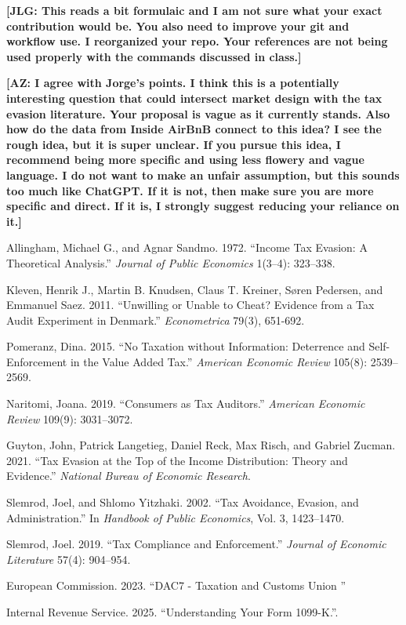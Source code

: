 \documentclass[11pt]{article}
\begin{document}
\bigskip 

\noindent \textbf{[JLG: This reads a bit formulaic and I am not sure what your exact contribution would be. You also need to improve your git and workflow use. I reorganized your repo. Your references are not being used properly with the commands discussed in class.]}

\vspace{5em}

\noindent \textbf{[AZ: I agree with Jorge's points. I think this is a potentially interesting question that could intersect market design with the tax evasion literature. Your proposal is vague as it currently stands. Also how do the data from Inside AirBnB connect to this idea? I see the rough idea, but it is super unclear. If you pursue this idea, I recommend being more specific and using less flowery and vague language. I do not want to make an unfair assumption, but this sounds too much like ChatGPT. If it is not, then make sure you are more specific and direct. If it is, I strongly suggest reducing your reliance on it.]}

\newpage
\begin{thebibliography}{9}\small
{}
Allingham, Michael G., and Agnar Sandmo. 1972. ``Income Tax Evasion: A Theoretical Analysis.'' \textit{Journal of Public Economics} 1(3--4): 323--338.

Kleven, Henrik J., Martin B. Knudsen, Claus T. Kreiner, S\o ren Pedersen, and Emmanuel Saez. 2011. ``Unwilling or Unable to Cheat? Evidence from a Tax Audit Experiment in Denmark.'' \textit{Econometrica} 79(3), 651-692.

Pomeranz, Dina. 2015. ``No Taxation without Information: Deterrence and Self-Enforcement in the Value Added Tax.'' \textit{American Economic Review} 105(8): 2539--2569.

Naritomi, Joana. 2019. ``Consumers as Tax Auditors.'' \textit{American Economic Review} 109(9): 3031--3072.

Guyton, John, Patrick Langetieg, Daniel Reck, Max Risch, and Gabriel Zucman. 2021. ``Tax Evasion at the Top of the Income Distribution: Theory and Evidence.'' \textit{National Bureau of Economic Research}.

Slemrod, Joel, and Shlomo Yitzhaki. 2002. ``Tax Avoidance, Evasion, and Administration.'' In \textit{Handbook of Public Economics}, Vol. 3, 1423--1470.

Slemrod, Joel. 2019. ``Tax Compliance and Enforcement.'' \textit{Journal of Economic Literature} 57(4): 904--954.

European Commission. 2023. ``DAC7 - Taxation and Customs Union
'' 

Internal Revenue Service. 2025. ``Understanding Your Form 1099-K.''.

\end{thebibliography}
\end{document}
